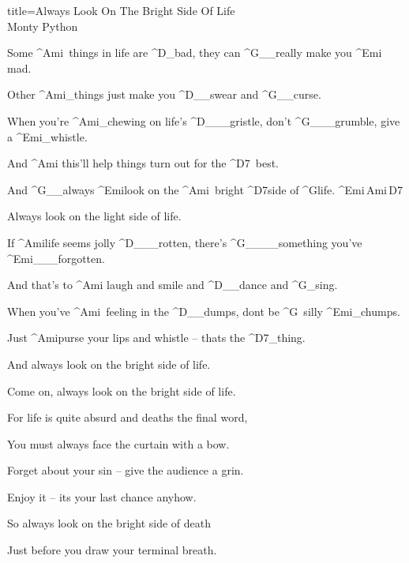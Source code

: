 \begin{song}{title=\predtitle \centering Always Look On The Bright Side Of Life \\\large Monty Python  \vspace*{-0.3cm}}  %
\begin{centerjustified}
\velky
\sloka 
	Some ^{Ami\,\,\,}things in life are ^{D{\color{white}\_}}bad, they can ^{G{\color{white}\_\_}}really make you ^{Emi\,\,\,}mad.

	Other ^{Ami{\color{white}\_}}things just make you ^{D{\color{white}\_\_}}swear and ^{G{\color{white}\_\_}}curse.

	When you're ^{Ami{\color{white}\_}}chewing on life's ^{D{\color{white}\_\_\_}}gristle, don't ^{G{\color{white}\_\_\_}}grumble, give a ^{Emi{\color{white}\_}}whistle.

	And ^{Ami\,\,}this'll help things turn out for the ^{D7\,\,\,}best.

	And ^{G{\color{white}\_\_}}always ^{Emi}look on the ^{Ami\,\,\,}bright ^{D7}side of ^{G}life. ^{Emi\,Ami\,D7}

	Always look on the light side of life.

\sloka
	If ^{Ami}life seems jolly ^{D{\color{white}\_\_\_}}rotten, there's ^{G{\color{white}\_\_\_\_}}something you've ^{Emi{\color{white}\_\_\_}}forgotten.

	And that's to ^{Ami\,\,}laugh and smile and ^{D{\color{white}\_\_}}dance and ^{G{\color{white}\_}}sing.
	
	When you've ^{Ami\,\,\,}feeling in the ^{D{\color{white}\_\_}}dumps, don\ap t be ^{G\,\,\,}silly ^{Emi{\color{white}\_}}chumps.

	Just ^{Ami}purse your lips and whistle -- that\ap s the ^{D7{\color{white}\_}}thing.

	And always look on the bright side of life.

	Come on, always look on the bright side of life.


\sloka
	For life is quite absurd and death\ap s the final word,

	You must always face the curtain with a bow.

	Forget about your sin -- give the audience a grin.

	Enjoy it -- it\ap s your last chance anyhow.


	So always look on the bright side of death
	
	Just before you draw your terminal breath.


\end{centerjustified}
\end{song}
